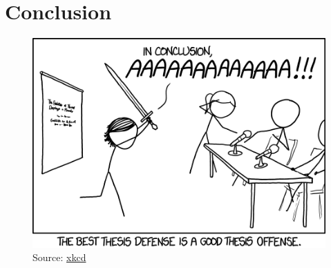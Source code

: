 \chapter{Conclusion}
\label{cha:conclusion}

\begin{figure}[h]
    \centering
    \includegraphics[width=\textwidth]{gfx/xkcd/1403.png}
    \caption*{Source: \href{https://xkcd.com/1403/}{xkcd}}
\end{figure}


